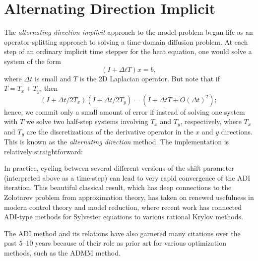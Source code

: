 \section{Alternating Direction Implicit}

The {\em alternating direction implicit} approach to the model problem
began life as an operator-splitting approach to solving a time-domain
diffusion problem.  At each step of an ordinary implicit time stepper
for the heat equation, one would solve a system of the form
\[
  (I+\Delta t T) x = b,
\]
where $\Delta t$ is small and $T$ is the 2D Laplacian operator.  But
note that if $T = T_x + T_y$, then
\[
  (I+\Delta t/2 T_x)(I+ \Delta t/2 T_y) = (I+\Delta t T + O(\Delta t)^2);
\]
hence, we commit only a small amount of error if instead of solving one
system with $T$ we solve two half-step systems involving $T_x$ and $T_y$,
respectively, where $T_x$ and $T_y$ are the discretizations of the
derivative operator in the $x$ and $y$ directions.  This is known as the
{\em alternating direction} method.  The implementation is relatively
straightforward:


In practice, cycling between several different versions of the shift parameter
(interpreted above as a time-step) can lead to very rapid convergence of
the ADI iteration.  This beautiful classical result, which has deep
connections to the Zolotarev problem from approximation theory, has taken
on renewed usefulness in modern control theory and model reduction,
where recent work has connected ADI-type methods for Sylvester equations
to various rational Krylov methods.

The ADI method and its relations have also garnered many citations over
the past 5--10 years because of their role as prior art for various
optimization methods, such as the ADMM method.
